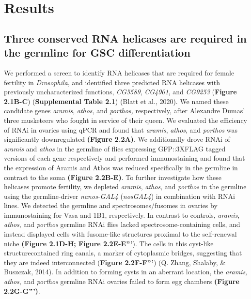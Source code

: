 \documentclass[12pt,oneside]{reedthesis}
\begin{document}
\hypertarget{results}{%
\section{Results}\label{results}}

\hypertarget{three-conserved-rna-helicases-are-required-in-the-germline-for-gsc-differentiation}{%
\subsection{Three conserved RNA helicases are required in the germline for GSC differentiation}\label{three-conserved-rna-helicases-are-required-in-the-germline-for-gsc-differentiation}}

We performed a screen to identify RNA helicases that are required for female fertility in \emph{Drosophila}, and identified three predicted RNA helicases with previously uncharacterized functions, \emph{CG5589}, \emph{CG4901}, and \emph{CG9253} (\textbf{Figure 2.1B-C}) (\textbf{Supplemental Table 2.1}) (Blatt et al., 2020). We named these candidate genes \emph{aramis}, \emph{athos}, and \emph{porthos,} respectively, after Alexandre Dumas' three musketeers who fought in service of their queen. We evaluated the efficiency of RNAi in ovaries using qPCR and found that \emph{aramis}, \emph{athos}, and \emph{porthos} was significantly downregulated \textbf{(Figure 2.2A)}. We additionally drove RNAi of \emph{aramis} and \emph{athos} in the germline of flies expressing GFP::3XFLAG tagged versions of each gene respectively and performed immunostaining and found that the expression of Aramis and Athos was reduced specifically in the germline in contrast to the soma \textbf{(Figure 2.2B-E)}. To further investigate how these helicases promote fertility, we depleted \emph{aramis}, \emph{athos}, and \emph{porthos} in the germline using the germline-driver \emph{nanos}-\emph{GAL4} (\emph{nosGAL4}) in combination with RNAi lines. We detected the germline and spectrosomes/fusomes in ovaries by immunostaining for Vasa and 1B1, respectively. In contrast to controls, \emph{aramis}, \emph{athos}, and \emph{porthos} germline RNAi flies lacked spectrosome-containing cells, and instead displayed cells with fusome-like structures proximal to the self-renewal niche \textbf{(Figure 2.1D-H; Figure 2.2E-E'''}). The cells in this cyst-like structurecontained ring canals, a marker of cytoplasmic bridges, suggesting that they are indeed interconnected (\textbf{Figure 2.2F-F'''}) (Q. Zhang, Shalaby, \& Buszczak, 2014). In addition to forming cysts in an aberrant location, the \emph{aramis}, \emph{athos}, and \emph{porthos} germline RNAi ovaries failed to form egg chambers \textbf{(Figure 2.2G-G''')}.
\end{document}
